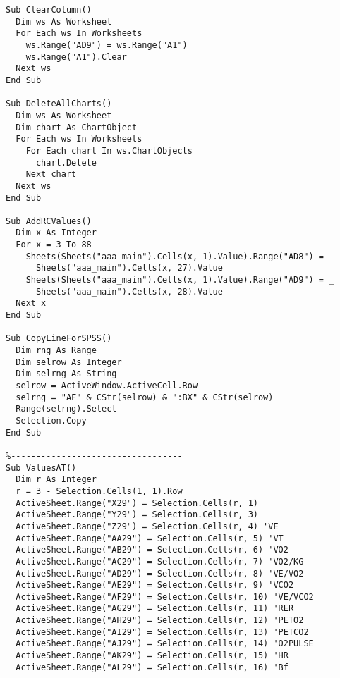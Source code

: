 \begin{lstlisting}
Sub ClearColumn()
  Dim ws As Worksheet
  For Each ws In Worksheets
    ws.Range("AD9") = ws.Range("A1")
    ws.Range("A1").Clear
  Next ws
End Sub

Sub DeleteAllCharts()
  Dim ws As Worksheet
  Dim chart As ChartObject
  For Each ws In Worksheets
    For Each chart In ws.ChartObjects
      chart.Delete
    Next chart
  Next ws
End Sub

Sub AddRCValues()
  Dim x As Integer
  For x = 3 To 88
    Sheets(Sheets("aaa_main").Cells(x, 1).Value).Range("AD8") = _
      Sheets("aaa_main").Cells(x, 27).Value
    Sheets(Sheets("aaa_main").Cells(x, 1).Value).Range("AD9") = _
      Sheets("aaa_main").Cells(x, 28).Value
  Next x
End Sub

Sub CopyLineForSPSS()
  Dim rng As Range
  Dim selrow As Integer
  Dim selrng As String  
  selrow = ActiveWindow.ActiveCell.Row
  selrng = "AF" & CStr(selrow) & ":BX" & CStr(selrow)
  Range(selrng).Select
  Selection.Copy
End Sub

%----------------------------------
Sub ValuesAT()
  Dim r As Integer
  r = 3 - Selection.Cells(1, 1).Row
  ActiveSheet.Range("X29") = Selection.Cells(r, 1)
  ActiveSheet.Range("Y29") = Selection.Cells(r, 3)
  ActiveSheet.Range("Z29") = Selection.Cells(r, 4) 'VE
  ActiveSheet.Range("AA29") = Selection.Cells(r, 5) 'VT
  ActiveSheet.Range("AB29") = Selection.Cells(r, 6) 'VO2
  ActiveSheet.Range("AC29") = Selection.Cells(r, 7) 'VO2/KG
  ActiveSheet.Range("AD29") = Selection.Cells(r, 8) 'VE/VO2
  ActiveSheet.Range("AE29") = Selection.Cells(r, 9) 'VCO2
  ActiveSheet.Range("AF29") = Selection.Cells(r, 10) 'VE/VCO2
  ActiveSheet.Range("AG29") = Selection.Cells(r, 11) 'RER
  ActiveSheet.Range("AH29") = Selection.Cells(r, 12) 'PETO2
  ActiveSheet.Range("AI29") = Selection.Cells(r, 13) 'PETCO2
  ActiveSheet.Range("AJ29") = Selection.Cells(r, 14) 'O2PULSE
  ActiveSheet.Range("AK29") = Selection.Cells(r, 15) 'HR
  ActiveSheet.Range("AL29") = Selection.Cells(r, 16) 'Bf
  

\end{lstlisting}
